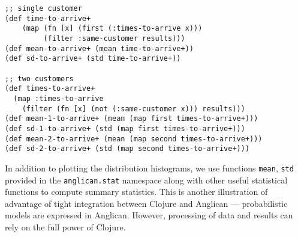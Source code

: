 \begin{lstlisting}[style=default]
;; single customer                      
(def time-to-arrive+ 
    (map (fn [x] (first (:times-to-arrive x)))
         (filter :same-customer results)))
(def mean-to-arrive+ (mean time-to-arrive+))
(def sd-to-arrive+ (std time-to-arrive+))

;; two customers
(def times-to-arrive+ 
  (map :times-to-arrive 
    (filter (fn [x] (not (:same-customer x))) results)))
(def mean-1-to-arrive+ (mean (map first times-to-arrive+)))
(def sd-1-to-arrive+ (std (map first times-to-arrive+)))
(def mean-2-to-arrive+ (mean (map second times-to-arrive+)))
(def sd-2-to-arrive+ (std (map second times-to-arrive+)))
\end{lstlisting}

In addition to plotting the distribution histograms, we use
functions \texttt{mean}, \texttt{std} provided
in the \texttt{anglican.{\linebreak[0]}stat} namespace
along with other useful statistical functions to compute
summary statistics. This is another illustration of advantage of
tight integration between Clojure and Anglican --- probabilistic
models are expressed in Anglican. However, processing of data
and results can rely on the full power of Clojure.
